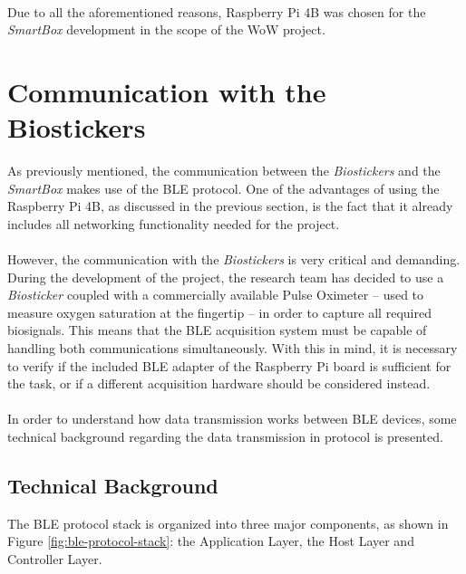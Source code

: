 \paragraph{} Due to all the aforementioned reasons, Raspberry Pi 4B was chosen for the \textit{SmartBox} development in the scope of the \acs{WoW} project.

\section{Communication with the Biostickers}

As previously mentioned, the communication between the \textit{Biostickers} and the \textit{SmartBox} makes use of the \acs{BLE} protocol. One of the advantages of using the Raspberry Pi 4B, as discussed in the previous section, is the fact that it already includes all networking functionality needed for the project. 

\paragraph{} However, the communication with the \textit{Biostickers} is very critical and demanding. During the development of the project, the research team has decided to use a \textit{Biosticker} coupled with a commercially available Pulse Oximeter%
-- used to measure oxygen saturation at the fingertip --  in order to capture all required biosignals. This means that the \acs{BLE} acquisition system must be capable of handling both communications simultaneously. With this in mind, it is necessary to verify if the included \acs{BLE} adapter of the Raspberry Pi board is sufficient for the task, or if a different acquisition hardware should be considered instead.

\paragraph{} In order to understand how data transmission works between \acs{BLE} devices, some technical background regarding the data transmission in protocol is presented.

\subsection{Technical Background} 
The \acs{BLE} protocol stack is organized into three major components, as shown in Figure \ref{fig:ble-protocol-stack}: the Application Layer, the Host Layer and Controller Layer. 

